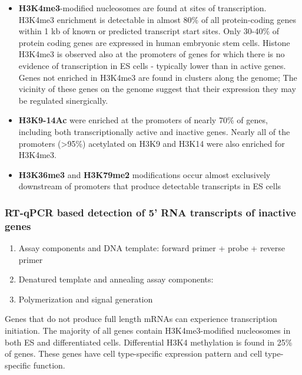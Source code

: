 \begin{itemize}
\tightlist
\item
  \textbf{H3K4me3}-modified nucleosomes are found at sites of transcription. H3K4me3 enrichment is detectable in almost 80\% of all protein-coding genes within 1 kb of known or predicted transcript start sites. Only 30-40\% of protein coding genes are expressed in human embryonic stem cells. Histone H3K4me3 is observed also at the promoters of genes for which there is no evidence of transcription in ES cells - typically lower than in active genes. Genes not enriched in H3K4me3 are found in clusters along the genome; The vicinity of these genes on the genome suggest that their expression they may be regulated sinergically.
\item
  \textbf{H3K9-14Ac} were enriched at the promoters of nearly 70\% of genes, including both transcriptionally active and inactive genes. Nearly all of the promoters (\textgreater95\%) acetylated on H3K9 and H3K14 were also enriched for H3K4me3.
\item
  \textbf{H3K36me3} and \textbf{H3K79me2} modifications occur almost exclusively downstream of promoters that produce detectable transcripts in ES cells
\end{itemize}

\hypertarget{rt-qpcr-based-detection-of-5-rna-transcripts-of-inactive-genes}{%
\subsubsection{RT-qPCR based detection of 5' RNA transcripts of inactive genes}\label{rt-qpcr-based-detection-of-5-rna-transcripts-of-inactive-genes}}

\begin{enumerate}
\def\labelenumi{\arabic{enumi}.}
\tightlist
\item
  Assay components and DNA template: forward primer + probe + reverse primer
\item
  Denatured template and annealing assay components:
\item
  Polymerization and signal generation
\end{enumerate}

Genes that do not produce full length mRNAs can experience transcription initiation. The majority of all genes contain H3K4me3-modified nucleosomes in both ES and differentiated cells. Differential H3K4 methylation is found in 25\% of genes. These genes have cell type-specific expression pattern and cell type-specific function.

